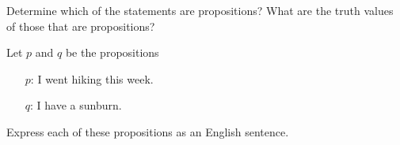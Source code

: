 \documentclass[12pt,addpoints]{exam}
\begin{document}
\begin{questions}

\question[4] Determine which of the statements are propositions? What are the truth values of those that are propositions?
    \begin{solution}
    \end{solution}

\question[10] Let $p$ and $q$ be the propositions
 \begin{itemize}
    \item[$p$:] I went hiking this week.
    \item[$q$:] I have a sunburn.
 \end{itemize}
 Express each of these propositions as an English sentence.
    \begin{parts}

\end{parts}
\end{questions}
\end{document}
